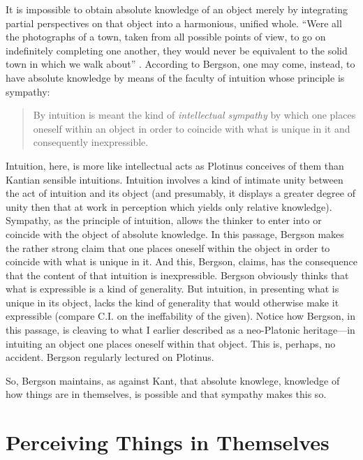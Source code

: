 It is impossible to obtain absolute knowledge of an object merely by integrating partial perspectives on that object into a harmonious, unified whole. ``Were all the photographs of a town, taken from all possible points of view, to go on indefinitely completing one another, they would never be equivalent to the solid town in which we walk about'' \citep[5]{Bergson:1912ud}. According to Bergson, one may come, instead, to have absolute knowledge by means of the faculty of intuition whose principle is sympathy:
\begin{quote}
	By intuition is meant the kind of \emph{intellectual sympathy} by which one places oneself within an object in order to coincide with what is unique in it and consequently inexpressible. \citep[7]{Bergson:1912ud}
\end{quote}
Intuition, here, is more like intellectual acts as Plotinus conceives of them than Kantian sensible intuitions. Intuition involves a kind of intimate unity between the act of intuition and its object (and presumably, it displays a greater degree of unity then that at work in perception which yields only relative knowledge). Sympathy, as the principle of intuition, allows the thinker to enter into or coincide with the object of absolute knowledge. In this passage, Bergson makes the rather strong claim that one places oneself within the object in order to coincide with what is unique in it. And this, Bergson, claims, has the consequence that the content of that intuition is inexpressible. Bergson obviously thinks that what is expressible is a kind of generality. But intuition, in presenting what is unique in its object, lacks the kind of generality that would otherwise make it expressible (compare C.I. \citealt[52]{Lewis:1929fk} on the ineffability of the given). Notice how Bergson, in this passage, is cleaving to what I earlier described as a neo-Platonic heritage---in intuiting an object one places oneself within that object. This is, perhaps, no accident. Bergson regularly lectured on Plotinus.

So, Bergson maintains, as against Kant, that absolute knowlege, knowledge of how things are in themselves, is possible and that sympathy makes this so. 


\section{Perceiving Things in Themselves} %
\label{sec:perceiving_things_in_themselves}

